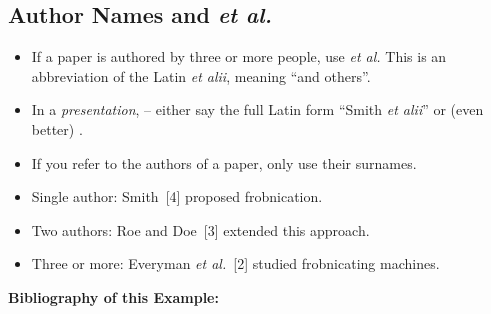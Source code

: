\documentclass[11pt,a4paper]{article}
\begin{document}
\subsection{Author Names and \emph{et al.}}
\label{sec-author-names-et-al}

\begin{itemize}
    \item If a paper is authored by three or more people, use \emph{et al.} This is an abbreviation of the Latin \emph{et alii}, meaning ``and others''.
    \item In a \emph{presentation},  -- either say the full Latin form ``Smith \emph{et alii}'' or (even better) .
    \item If you refer to the authors of a paper, only use their surnames.
\end{itemize}

\begin{goodexample}
  \begin{NoHyper}
    \begin{itemize}[leftmargin=1em]
        \item Single author: Smith~[4] proposed frobnication.
        
        \item Two authors: Roe and Doe~[3] extended this approach.
        
        \item Three or more: Everyman \emph{et al.}~[2] studied frobnicating machines.
    \end{itemize}

    \vspace{2.0em}

    {\normalsize{}
    \textbf{Bibliography of this Example:}
    \vspace{1em}
    
    {\normalsize
        
        
    }
    }
  \end{NoHyper}
\end{goodexample}
\end{document}
